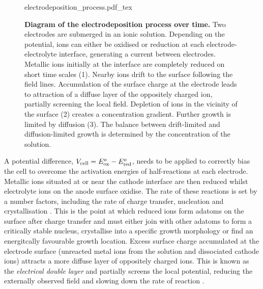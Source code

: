 \documentclass{article}
\begin{document}
\begin{figure}[bt]
{\fontsize{10pt}{1em}\selectfont \def\svgwidth{0.9\textwidth} {electrodeposition_process.pdf_tex}}
\caption[Diagram of the electrodeposition process over time.]{\textbf{Diagram of the electrodeposition process over time.} Two electrodes are submerged in an ionic solution. Depending on the potential, ions can either be oxidised or reduction at each electrode-electrolyte interface, generating a current between electrodes. Metallic ions initially at the interface are completely reduced on short time scales (1). Nearby ions drift to the surface following the field lines. Accumulation of the surface charge at the electrode leads to attraction of a diffuse layer of the oppositely charged ion, partially screening the local field. Depletion of ions in the vicinity of the surface (2) creates a concentration gradient. Further growth is limited by diffusion (3). The balance between drift-limited and diffusion-limited growth is determined by the concentration of the solution.}
\label{fig:electrodeposition_process}
\end{figure}

A potential difference, $V_{\mathrm{cell}} = E^o_{\mathrm{ox}}-E^o_{\mathrm{red}}$, needs to be applied to correctly bias the cell to overcome the activation energies of half-reactions at each electrode. Metallic ions situated at or near the cathode interface are then reduced whilst electrolyte ions on the anode surface oxidise. The rate of these reactions is set by a number factors, including the rate of charge transfer, nucleation and crystallisation \cite{paunovic2006fundamentals}. This is the point at which reduced ions form adatoms on the surface after charge transfer and must either join with other adatoms to form a critically stable nucleus, crystallise into a specific growth morphology or find an energitcally favourable growth location. Excess surface charge accumulated at the electrode surface (unreacted metal ions from the solution and dissociated cathode ions) attracts a more diffuse layer of oppositely charged ions. This is known as the \textit{electrical double layer} and partially screens the local potential, reducing the externally observed field and slowing down the rate of reaction \cite{bard2001electrochemical}.
\end{document}
